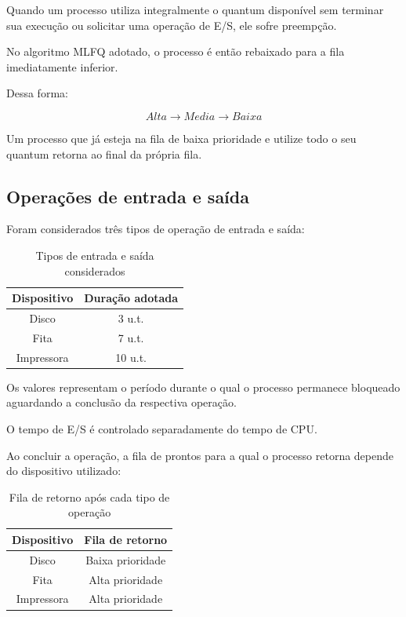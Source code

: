 \documentclass[12pt,a4paper]{article}
\begin{document}
Quando um processo utiliza integralmente o quantum disponível sem
terminar sua execução ou solicitar uma operação de E/S, ele sofre
preempção.

No algoritmo MLFQ adotado, o processo é então rebaixado para a fila
imediatamente inferior.

Dessa forma:

\[
Alta \rightarrow Media \rightarrow Baixa
\]

Um processo que já esteja na fila de baixa prioridade e utilize todo
o seu quantum retorna ao final da própria fila.

\subsection{Operações de entrada e saída}

Foram considerados três tipos de operação de entrada e saída:

\begin{table}[H]
    \centering
    \caption{Tipos de entrada e saída considerados}
    \begin{tabular}{cc}
        \toprule
        \textbf{Dispositivo} &
        \textbf{Duração adotada} \\
        \midrule
        Disco       & 3 u.t. \\
        Fita        & 7 u.t. \\
        Impressora  & 10 u.t. \\
        \bottomrule
    \end{tabular}
\end{table}

Os valores representam o período durante o qual o processo permanece
bloqueado aguardando a conclusão da respectiva operação.

O tempo de E/S é controlado separadamente do tempo de CPU.

Ao concluir a operação, a fila de prontos para a qual o processo
retorna depende do dispositivo utilizado:

\begin{table}[H]
    \centering
    \caption{Fila de retorno após cada tipo de operação}
    \begin{tabular}{cc}
        \toprule
        \textbf{Dispositivo} &
        \textbf{Fila de retorno} \\
        \midrule
        Disco       & Baixa prioridade \\
        Fita        & Alta prioridade  \\
        Impressora  & Alta prioridade  \\
        \bottomrule
    \end{tabular}
\end{table}
\end{document}
